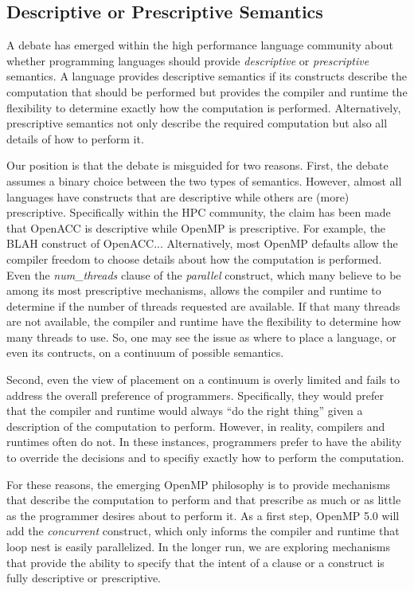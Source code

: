 \subsection{Descriptive or Prescriptive Semantics}
\label{sub:descriptive}

A debate has emerged within the high performance language
community about whether programming languages should 
provide \emph{descriptive} or \emph{prescriptive} semantics. 
A language provides descriptive semantics if its constructs 
describe the computation that should be performed but provides 
the compiler and runtime the flexibility to determine exactly 
how the computation is performed. Alternatively, prescriptive
semantics not only describe the required computation but 
also all details of how to perform it.

Our position is that the debate is misguided for two reasons.
First, the debate assumes a binary choice between the two 
types of semantics. However, almost all languages have constructs 
that are descriptive while others are (more) prescriptive. 
Specifically within the HPC community, the claim has been 
made that OpenACC is descriptive while OpenMP is prescriptive.
For example, the BLAH construct of OpenACC...
Alternatively, most OpenMP defaults allow the compiler freedom
to choose details about how the computation is performed. Even
the \emph{num\_threads} clause of the \emph{parallel} construct,
which many believe to be among its most prescriptive mechanisms,
allows the compiler and runtime to determine if the number of
threads requested are available. If that many threads are not
available, the compiler and runtime have the flexibility to
determine how many threads to use. So, one may see the issue 
as where to place a language, or even its contructs, on a 
continuum of possible semantics.

Second, even the view of placement on a continuum is overly
limited and fails to address the overall preference of 
programmers. Specifically, they would prefer that the compiler
and runtime would always ``do the right thing'' given a 
description of the computation to perform. However, in reality,
compilers and runtimes often do not. In these instances,
programmers prefer to have the ability to override the
decisions and to specifiy exactly how to perform the computation.

For these reasons, the emerging OpenMP philosophy is to provide
mechanisms that describe the computation to perform and that
prescribe as much or as little as the programmer desires about
to perform it. As a first step, OpenMP 5.0 will add the 
\emph{concurrent} construct, which only informs the compiler 
and runtime that loop nest is easily parallelized. In the 
longer run, we are exploring mechanisms that provide the ability 
to specify that the intent of a clause or a construct is 
fully descriptive or prescriptive.
